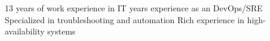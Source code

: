 \documentclass[9pt]{developercv} %
\begin{document}
\vspace{0.5cm}



\begin{minipage}[t]{0.4\textwidth} %
	\vspace{-\baselineskip} %
	13 years of work experience in IT\newline{} years experience as an DevOps/SRE\newline\newline
    Specialized in troubleshooting and automation\newline\newline
    Rich experience in high-availability systems\newline\newline
\end{minipage}
\hfill %
\begin{minipage}[t]{0.5\textwidth} %
	\vspace{-\baselineskip} %
	\begin{barchart}{5.5}
	\end{barchart}
\end{minipage}


\end{document}
